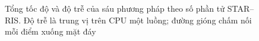 \begin{figure}[htbp]
\centering
\resizebox{0.95\textwidth}{!}{}
\caption[Tổng tốc độ và độ trễ của sáu phương pháp theo số phần tử STAR--RIS]{Tổng tốc độ và độ trễ của sáu phương pháp theo số phần tử STAR--RIS. Độ trễ là trung vị trên CPU một luồng; đường gióng chấm nối mỗi điểm xuống mặt đáy}
\label{fig:ch4-danh-doi-3d}
\end{figure}
